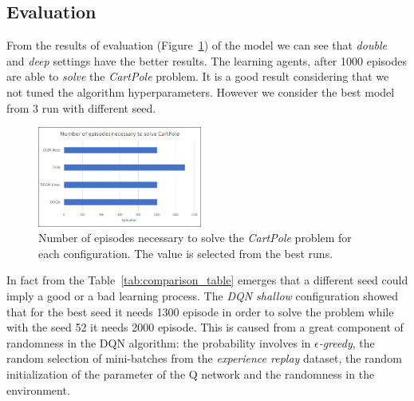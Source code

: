 \subsection{Evaluation}

From the results of evaluation (Figure~\ref{fig:comparison}) of the model we can see that \textit{double} and \textit{deep} settings have the better results. The learning agents, after 1000 episodes are able to \textit{solve} the \textit{CartPole} problem. It is a good result considering that we not tuned the algorithm hyperparameters. However we consider the best model from 3 run with different seed. 

\begin{figure}
	\centering
	\includegraphics[width=0.48\textwidth]{res/Comparison}
	\caption{Number of episodes necessary to solve the \textit{CartPole} problem for each configuration. The value is selected from the best runs.}
	\label{fig:comparison}
\end{figure}

In fact from the Table~\ref{tab:comparison_table} emerges that a different seed could imply a good or a bad learning process. The \textit{DQN shallow} configuration showed that for the best seed it needs 1300 episode in order to solve the problem while with the seed 52 it needs 2000 episode. This is caused from a great component of randomness in the DQN algorithm: the probability involves in \textit{$\epsilon$-greedy}, the random selection of mini-batches from the \textit{experience replay} dataset, the random initialization of the parameter of the Q network and the randomness in the environment.

